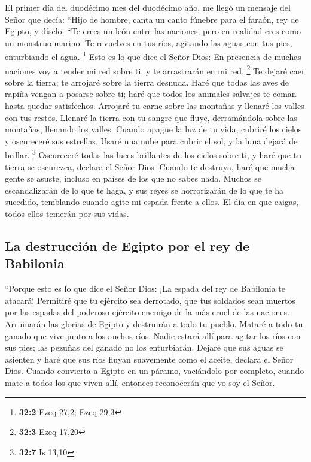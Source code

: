  El primer día del duodécimo mes del duodécimo año, me
llegó un mensaje del Señor que decía:  ``Hijo de hombre,
canta un canto fúnebre para el faraón, rey de Egipto, y díselo: ``Te
crees un león entre las naciones, pero en realidad eres como un monstruo
marino. Te revuelves en tus ríos, agitando las aguas con tus pies,
enturbiando el agua. \footnote{\textbf{32:2} Ezeq 27,2; Ezeq 29,3}
 Esto es lo que dice el Señor Dios: En presencia de muchas
naciones voy a tender mi red sobre ti, y te arrastrarán en mi red.
\footnote{\textbf{32:3} Ezeq 17,20}  Te dejaré caer sobre
la tierra; te arrojaré sobre la tierra desnuda. Haré que todas las aves
de rapiña vengan a posarse sobre ti; haré que todos los animales
salvajes te coman hasta quedar satisfechos.  Arrojaré tu
carne sobre las montañas y llenaré los valles con tus restos.
 Llenaré la tierra con tu sangre que fluye, derramándola
sobre las montañas, llenando los valles.  Cuando apague la
luz de tu vida, cubriré los cielos y oscureceré sus estrellas. Usaré una
nube para cubrir el sol, y la luna dejará de brillar. \footnote{\textbf{32:7}
  Is 13,10}  Oscureceré todas las luces brillantes de los
cielos sobre ti, y haré que tu tierra se oscurezca, declara el Señor
Dios.  Cuando te destruya, haré que mucha gente se asuste,
incluso en países de los que no sabes nada.  Muchos se
escandalizarán de lo que te haga, y sus reyes se horrorizarán de lo que
te ha sucedido, temblando cuando agite mi espada frente a ellos. El día
en que caigas, todos ellos temerán por sus vidas.

\hypertarget{la-destrucciuxf3n-de-egipto-por-el-rey-de-babilonia}{%
\subsection{La destrucción de Egipto por el rey de
Babilonia}\label{la-destrucciuxf3n-de-egipto-por-el-rey-de-babilonia}}

 ``Porque esto es lo que dice el Señor Dios: ¡La espada
del rey de Babilonia te atacará!  Permitiré que tu
ejército sea derrotado, que tus soldados sean muertos por las espadas
del poderoso ejército enemigo de la más cruel de las naciones.
Arruinarán las glorias de Egipto y destruirán a todo tu pueblo.
 Mataré a todo tu ganado que vive junto a los anchos
ríos. Nadie estará allí para agitar los ríos con sus pies; las pezuñas
del ganado no los enturbiarán.  Dejaré que sus aguas se
asienten y haré que sus ríos fluyan suavemente como el aceite, declara
el Señor Dios.  Cuando convierta a Egipto en un páramo,
vaciándolo por completo, cuando mate a todos los que viven allí,
entonces reconocerán que yo soy el Señor.

